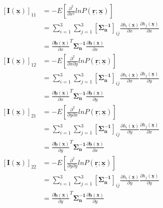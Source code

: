 \documentclass[a4 paper]{article}
\begin{document}
\vspace{-3.5em}

\begin{align*}
\\ [\mathbf{I(\mathbf{\underline{x}})}]_{11} &= -E[\frac{\partial^{2}}{\partial x^{2}}ln P(\mathbf{\underline{r}}; \mathbf{\underline{x}})]
\\ &= \sum_{i =1}^{3}\sum_{j=1}^{3} [\mathbf{\Sigma_{n}^{-1}}]_{ij}\frac{\partial h_{i}(\mathbf{\underline{x}})}{\partial x}\frac{\partial h_{j}(\mathbf{\underline{x}})}{\partial x}
\\ &= \frac{\partial \mathbf{\underline{h}}(\mathbf{\underline{x}})}{\partial x}^{T} \mathbf{\Sigma_{n}^{-1}} \frac{\partial \mathbf{\underline{h}(\mathbf{\underline{x}})}}{\partial x}
\\ [\mathbf{I(\mathbf{\underline{x}})}]_{12} &= -E[\frac{\partial^{2}}{\partial x \partial y}ln P(\mathbf{\underline{r}}; \mathbf{\underline{x}})]
\\ &= \sum_{i =1}^{3}\sum_{j=1}^{3} [\mathbf{\Sigma_{n}^{-1}}]_{ij}\frac{\partial h_{i}(\mathbf{\underline{x}})}{\partial x}\frac{\partial h_{j}(\mathbf{\underline{x}})}{\partial y}
\\ &= \frac{\partial \mathbf{\underline{h}}(\mathbf{\underline{x}})}{\partial x}^{T} \mathbf{\Sigma_{n}^{-1}} \frac{\partial \mathbf{\underline{h}(\mathbf{\underline{x}})}}{\partial y}
\\ [\mathbf{I(\mathbf{\underline{x}})}]_{21} &= -E[\frac{\partial^{2}}{\partial y \partial x}ln P(\mathbf{\underline{r}}; \mathbf{\underline{x}})]
\\ &= \sum_{i =1}^{3}\sum_{j=1}^{3} [\mathbf{\Sigma_{n}^{-1}}]_{ij}\frac{\partial h_{i}(\mathbf{\underline{x}})}{\partial y}\frac{\partial h_{j}(\mathbf{\underline{x}})}{\partial x}
\\ &= \frac{\partial \mathbf{\underline{h}}(\mathbf{\underline{x}})}{\partial y}^{T} \mathbf{\Sigma_{n}^{-1}} \frac{\partial \mathbf{\underline{h}(\mathbf{\underline{x}})}}{\partial x}
\\ [\mathbf{I(\mathbf{\underline{x}})}]_{22} &= -E[\frac{\partial^{2}}{\partial y \partial y}ln P(\mathbf{\underline{r}}; \mathbf{\underline{x}})]
\\ &= \sum_{i =1}^{3}\sum_{j=1}^{3} [\mathbf{\Sigma_{n}^{-1}}]_{ij}\frac{\partial h_{i}(\mathbf{\underline{x}})}{\partial y}\frac{\partial h_{j}(\mathbf{\underline{x}})}{\partial y}
\\ &= \frac{\partial \mathbf{\underline{h}}(\mathbf{\underline{x}})}{\partial y}^{T} \mathbf{\Sigma_{n}^{-1}} \frac{\partial \mathbf{\underline{h}(\mathbf{\underline{x}})}}{\partial y}
\end{align*}
\end{document}
